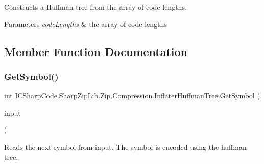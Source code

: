 Constructs a Huffman tree from the array of code lengths. 


\begin{DoxyParams}{Parameters}
{\em code\+Lengths} & the array of code lengths \\
\hline
\end{DoxyParams}


\subsection{Member Function Documentation}
\mbox{\label{class_i_c_sharp_code_1_1_sharp_zip_lib_1_1_zip_1_1_compression_1_1_inflater_huffman_tree_a2502c53f425e721c34ccfee00355ae3a}} 
\subsubsection{\texorpdfstring{Get\+Symbol()}{GetSymbol()}\hspace{0.1cm}{\footnotesize\ttfamily [1/2]}}
{\footnotesize\ttfamily int I\+C\+Sharp\+Code.\+Sharp\+Zip\+Lib.\+Zip.\+Compression.\+Inflater\+Huffman\+Tree.\+Get\+Symbol (\begin{DoxyParamCaption}\item[{\hyperlink{class_i_c_sharp_code_1_1_sharp_zip_lib_1_1_zip_1_1_compression_1_1_streams_1_1_stream_manipulator}{Stream\+Manipulator}}]{input }\end{DoxyParamCaption})\hspace{0.3cm}{\ttfamily [inline]}}



Reads the next symbol from input. The symbol is encoded using the huffman tree. 


